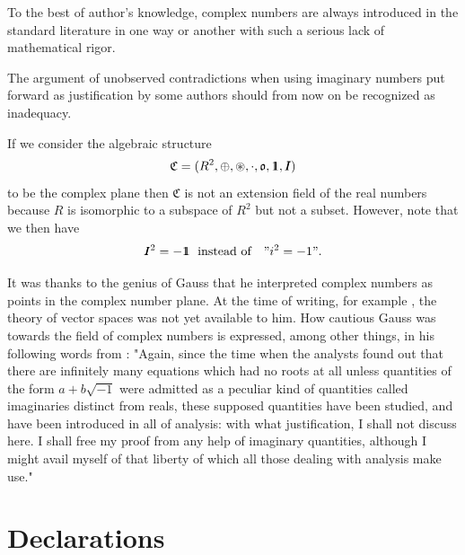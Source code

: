 \documentclass{amsart}
\theoremstyle{definition}
\theoremstyle{remark}
\numberwithin{equation}{section}
\begin{document}
To the best of author's knowledge, complex numbers are always introduced  in the standard literature in one way or another with such a serious lack of mathematical rigor.

The argument of unobserved contradictions when using imaginary numbers put forward as justification by some authors should from now on  be recognized as inadequacy.

If we consider the algebraic structure
\[\mathfrak C=(R^2,\oplus,\circledast,\cdot,\mathfrak o,1\hspace{-.14cm}1,I\hspace{-.19cm}I)\]
to be the complex plane
then $\mathfrak C$ is not an extension field of the real numbers because $R$ is isomorphic to a subspace of $R^2$ but not a subset. However, note that we then have
\[I\hspace{-.19cm}I^2=-1\hspace{-.14cm}1 \text{\; instead of\quad} "i^2=-1".\]

It was thanks to the genius of Gauss that he interpreted complex numbers as points in the complex number plane. At the time of writing, for example \cite{Gauss1799}, the theory of vector spaces was not yet available to him.
How cautious Gauss was towards the field of complex numbers is expressed, among other things, in his following words from \cite{Gauss1799}:
"Again, since the time when the analysts found out that there are infinitely many equations which
had no roots at all unless quantities of the form $a + b\sqrt{-1}$ were admitted as a peculiar kind of
quantities called imaginaries distinct from reals, these supposed quantities have been studied,
and have been introduced in all of analysis: with what justification, I shall not discuss here. I
shall free my proof from any help of imaginary quantities, although I might avail myself of that
liberty of which all those dealing with analysis make use."

\section{Declarations}
\end{document}
